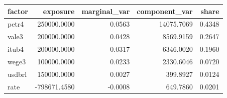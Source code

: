 \begin{tabular}{lrrrr}
\toprule
factor & exposure & marginal_var & component_var & share \\
\midrule
petr4 & 250000.0000 & 0.0563 & 14075.7069 & 0.4348 \\
vale3 & 200000.0000 & 0.0428 & 8569.9159 & 0.2647 \\
itub4 & 200000.0000 & 0.0317 & 6346.0020 & 0.1960 \\
wege3 & 100000.0000 & 0.0233 & 2330.6046 & 0.0720 \\
usdbrl & 150000.0000 & 0.0027 & 399.8927 & 0.0124 \\
rate & -798671.4580 & -0.0008 & 649.7860 & 0.0201 \\
\bottomrule
\end{tabular}
